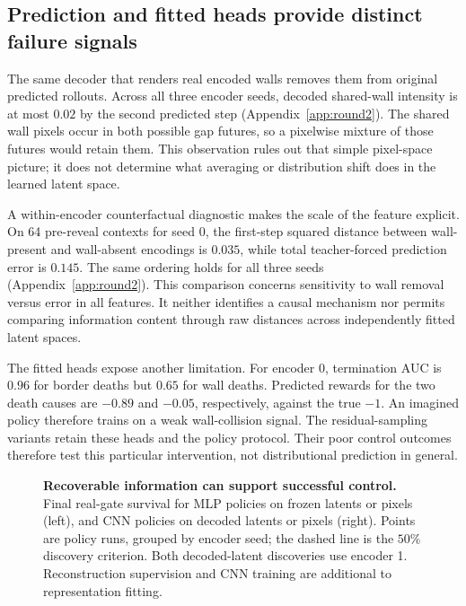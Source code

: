 \begin{table}[t]
\centering
\caption{\textbf{Final gate outcomes, with predictor variants kept separate.} Mean $\pm$ sample
standard deviation across policy runs; discovery is final survival above $50\%$. JEPA imagination variants and real-latent
conditions each contain $3$ models $\times$ $3$ policies; pixel controls have three policies. Real training changes rewards, terminations, and PPO protocol
alongside dynamics. Flow is a single-model reference.}
\label{tab:gate-main}
\end{table}



\subsection{Prediction and fitted heads provide distinct failure signals}
\label{app:results-mean}

The same decoder that renders real encoded walls removes them from original predicted rollouts.
Across all three encoder seeds, decoded shared-wall intensity is at most $0.02$ by the second
predicted step (Appendix~\ref{app:round2}). The shared wall pixels occur in both possible gap futures,
so a pixelwise mixture of those futures would retain them. This observation rules out that simple
pixel-space picture; it does not determine what averaging or distribution shift does in the learned
latent space.

A within-encoder counterfactual diagnostic makes the scale of the feature explicit. On 64 pre-reveal
contexts for seed 0, the first-step squared distance between wall-present and wall-absent encodings
is $0.035$, while total teacher-forced prediction error is $0.145$. The same ordering holds for all
three seeds (Appendix~\ref{app:round2}). This comparison concerns sensitivity to wall removal versus
error in all features. It neither identifies a causal mechanism nor permits comparing information
content through raw distances across independently fitted latent spaces.

The fitted heads expose another limitation. For encoder 0, termination AUC is $0.96$ for border
deaths but $0.65$ for wall deaths. Predicted rewards for the two death causes are $-0.89$ and $-0.05$,
respectively, against the true $-1$. An imagined policy therefore trains on a weak wall-collision
signal. The residual-sampling variants retain these heads and the policy protocol. Their poor control
outcomes therefore test this particular intervention, not distributional prediction in general.

\begin{figure}[t]
\centering
{}
\caption{\textbf{Recoverable information can support successful control.} Final real-gate survival
for MLP policies on frozen latents or pixels (left), and CNN policies on decoded latents or pixels
(right). Points are policy runs, grouped by encoder seed; the dashed line is the $50\%$ discovery criterion. Both decoded-latent discoveries
use encoder 1. Reconstruction supervision and CNN training are additional to representation fitting.}
\label{fig:representation}
\end{figure}
